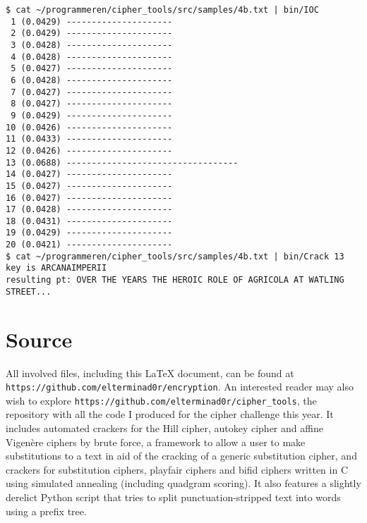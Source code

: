 \documentclass{article}
\begin{document}
\begin{lstlisting}[caption=Cracking 4b, label={lst:iocchart}]
$ cat ~/programmeren/cipher_tools/src/samples/4b.txt | bin/IOC 
 1 (0.0429) ---------------------
 2 (0.0429) ---------------------
 3 (0.0428) ---------------------
 4 (0.0428) ---------------------
 5 (0.0427) ---------------------
 6 (0.0428) ---------------------
 7 (0.0427) ---------------------
 8 (0.0427) ---------------------
 9 (0.0429) ---------------------
10 (0.0426) ---------------------
11 (0.0433) ---------------------
12 (0.0426) ---------------------
13 (0.0688) ----------------------------------
14 (0.0427) ---------------------
15 (0.0427) ---------------------
16 (0.0427) ---------------------
17 (0.0428) ---------------------
18 (0.0431) ---------------------
19 (0.0429) ---------------------
20 (0.0421) ---------------------
$ cat ~/programmeren/cipher_tools/src/samples/4b.txt | bin/Crack 13
key is ARCANAIMPERII
resulting pt: OVER THE YEARS THE HEROIC ROLE OF AGRICOLA AT WATLING STREET...
\end{lstlisting}

    \section{Source} All involved files, including this \LaTeX{} document, can
    be found at \verb|https://github.com/elterminad0r/encryption|. An
    interested reader may also wish to explore
    \verb|https://github.com/elterminad0r/cipher_tools|, the repository with
    all the code I produced for the cipher challenge this year. It includes
    automated crackers for the Hill cipher, autokey cipher and affine
    Vigen\`ere ciphers by brute force, a framework to allow a user to make
    substitutions to a text in aid of the cracking of a generic substitution
    cipher, and crackers for substitution ciphers, playfair ciphers and bifid
    ciphers written in C using simulated annealing (including quadgram
    scoring). It also features a slightly derelict Python script that tries to
    split punctuation-stripped text into
    words using a prefix tree.
\end{document}
